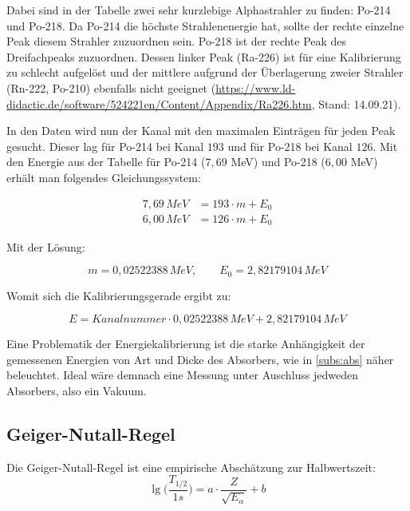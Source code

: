 
Dabei sind in der Tabelle zwei sehr kurzlebige Alphastrahler zu finden: Po-214 und Po-218. Da Po-214 die höchste Strahlenenergie hat, 
sollte der rechte einzelne Peak diesem Strahler zuzuordnen sein. Po-218 ist der rechte Peak des Dreifachpeaks zuzuordnen. Dessen 
linker Peak (Ra-226) ist für eine Kalibrierung zu schlecht aufgelöst und der mittlere aufgrund der Überlagerung zweier Strahler 
(Rn-222, Po-210) ebenfalls nicht geeignet
(\url{https://www.ld-didactic.de/software/524221en/Content/Appendix/Ra226.htm}, Stand: 14.09.21).

In den Daten wird nun der Kanal mit den maximalen Einträgen für jeden Peak gesucht. Dieser lag für Po-214 bei Kanal $193$ und 
für Po-218 bei Kanal $126$. Mit den Energie aus der Tabelle für Po-214 ($7,69$ MeV) und Po-218 ($6,00$ MeV) erhält man folgendes 
Gleichungssystem:

\begin{align*}{}
    7,69 \, MeV &= 193 \cdot m + E_0 \\
    6,00 \, MeV &= 126 \cdot m + E_0
\end{align*}

Mit der Lösung:

\begin{equation*}
    m = 0,02522388 \, MeV, \qquad E_0 = 2,82179104 \, MeV
\end{equation*}

Womit sich die Kalibrierungsgerade ergibt zu:

\begin{equation}
    E = Kanalnummer \cdot 0,02522388 \, MeV + 2,82179104 \, MeV
\end{equation}

Eine Problematik der Energiekalibrierung ist die starke Anhängigkeit der gemessenen Energien von Art und Dicke des Absorbers, wie in 
\ref{subs:abs} näher beleuchtet. Ideal wäre demnach eine Messung unter Auschluss jedweden Absorbers, also ein Vakuum.\\

\subsection{Geiger-Nutall-Regel}

Die Geiger-Nutall-Regel ist eine empirische Abschätzung zur Halbwertszeit:\\
\begin{equation}
    \lg \biggl (\frac{T_{1/2}}{1s} \biggl ) = a \cdot \frac{Z}{\sqrt{E_{\alpha}}} + b
    \label{eq:gnr}
\end{equation}


